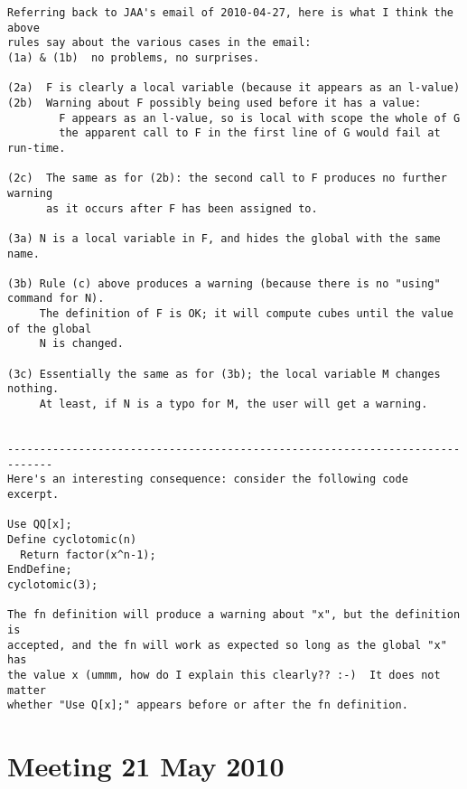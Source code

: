 \documentclass{book}[12,a4paper]
\begin{document}
\begin{verbatim}
Referring back to JAA's email of 2010-04-27, here is what I think the above
rules say about the various cases in the email:
(1a) & (1b)  no problems, no surprises.

(2a)  F is clearly a local variable (because it appears as an l-value)
(2b)  Warning about F possibly being used before it has a value:
        F appears as an l-value, so is local with scope the whole of G
        the apparent call to F in the first line of G would fail at run-time.

(2c)  The same as for (2b): the second call to F produces no further warning
      as it occurs after F has been assigned to.

(3a) N is a local variable in F, and hides the global with the same name.

(3b) Rule (c) above produces a warning (because there is no "using" command for N).
     The definition of F is OK; it will compute cubes until the value of the global
     N is changed.

(3c) Essentially the same as for (3b); the local variable M changes nothing.
     At least, if N is a typo for M, the user will get a warning.


-----------------------------------------------------------------------------
Here's an interesting consequence: consider the following code excerpt.

Use QQ[x];
Define cyclotomic(n)
  Return factor(x^n-1);
EndDefine;
cyclotomic(3);

The fn definition will produce a warning about "x", but the definition is
accepted, and the fn will work as expected so long as the global "x" has
the value x (ummm, how do I explain this clearly?? :-)  It does not matter
whether "Use Q[x];" appears before or after the fn definition.
\end{verbatim}

\section{Meeting 21 May 2010}
\end{document}
